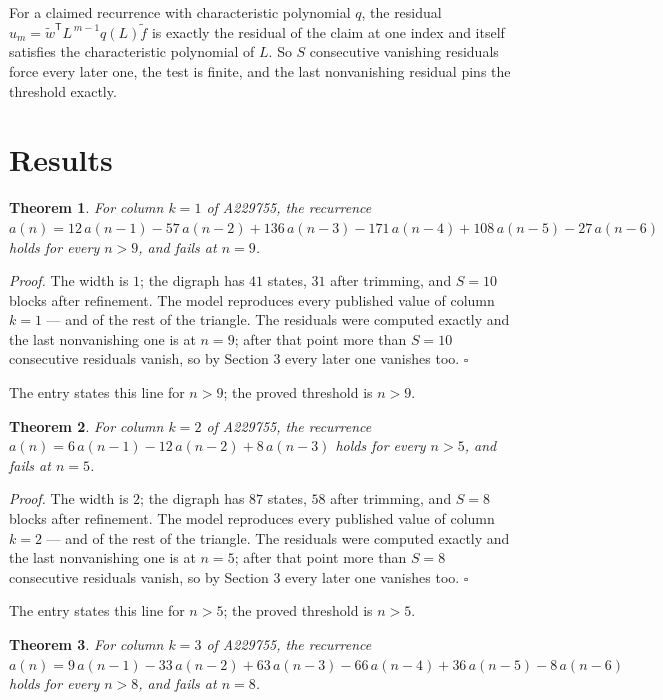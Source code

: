 \documentclass[11pt]{article}
\newtheorem{theorem}{Theorem}
\theoremstyle{definition}
\begin{document}
For a claimed recurrence with characteristic polynomial $q$, the residual $u_m = \tilde w^{\mathsf T}L^{\,m-1}q(L)\tilde f$ is exactly the residual of the claim at one index and itself satisfies the characteristic polynomial of $L$. So $S$ consecutive vanishing residuals force every later one, the test is finite, and the last nonvanishing residual pins the threshold exactly.

\section{Results}

\begin{theorem} For column $k = 1$ of A229755, the recurrence $a(n) = 12\,a(n-1) - 57\,a(n-2) + 136\,a(n-3) - 171\,a(n-4) + 108\,a(n-5) - 27\,a(n-6)$ holds for every $n > 9$, and fails at $n = 9$.\end{theorem}

{\itshape Proof.} The width is $1$; the digraph has $41$ states, $31$ after trimming, and $S = 10$ blocks after refinement. The model reproduces every published value of column $k = 1$ --- and of the rest of the triangle. The residuals were computed exactly and the last nonvanishing one is at $n = 9$; after that point more than $S = 10$ consecutive residuals vanish, so by Section 3 every later one vanishes too. $\square$

The entry states this line for $n > 9$; the proved threshold is $n > 9$.

\begin{theorem} For column $k = 2$ of A229755, the recurrence $a(n) = 6\,a(n-1) - 12\,a(n-2) + 8\,a(n-3)$ holds for every $n > 5$, and fails at $n = 5$.\end{theorem}

{\itshape Proof.} The width is $2$; the digraph has $87$ states, $58$ after trimming, and $S = 8$ blocks after refinement. The model reproduces every published value of column $k = 2$ --- and of the rest of the triangle. The residuals were computed exactly and the last nonvanishing one is at $n = 5$; after that point more than $S = 8$ consecutive residuals vanish, so by Section 3 every later one vanishes too. $\square$

The entry states this line for $n > 5$; the proved threshold is $n > 5$.

\begin{theorem} For column $k = 3$ of A229755, the recurrence $a(n) = 9\,a(n-1) - 33\,a(n-2) + 63\,a(n-3) - 66\,a(n-4) + 36\,a(n-5) - 8\,a(n-6)$ holds for every $n > 8$, and fails at $n = 8$.\end{theorem}
\end{document}

